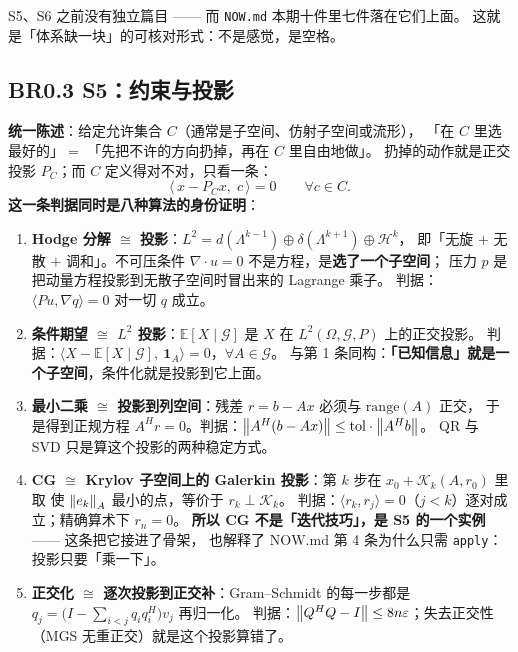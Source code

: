 S5、S6 之前没有独立篇目 —— 而 \texttt{NOW.md} 本期十件里七件落在它们上面。
这就是「体系缺一块」的可核对形式：不是感觉，是空格。

\subsection{BR0.3 S5：约束与投影}

\textbf{统一陈述}：给定允许集合 $C$（通常是子空间、仿射子空间或流形），
「在 $C$ 里选最好的」$=$ 「先把不许的方向扔掉，再在 $C$ 里自由地做」。
扔掉的动作就是正交投影 $P_C$；而 $C$ 定义得对不对，只看一条：
\[
\bigl\langle\, x-P_C x,\; c\,\bigr\rangle=0\qquad \forall c\in C .
\]
\textbf{这一条判据同时是八种算法的身份证明}：

\begin{enumerate}[leftmargin=1.5em]
  \item \textbf{Hodge 分解 $\cong$ 投影}：$L^{2}=d(\Lambda^{k-1})\oplus\delta(\Lambda^{k+1})\oplus\mathcal{H}^{k}$，
        即「无旋 $+$ 无散 $+$ 调和」。不可压条件 $\nabla\cdot u=0$ 不是方程，是\textbf{选了一个子空间}；
        压力 $p$ 是把动量方程投影到无散子空间时冒出来的 Lagrange 乘子。
        判据：$\langle Pu,\nabla q\rangle=0$ 对一切 $q$ 成立。
  \item \textbf{条件期望 $\cong$ $L^{2}$ 投影}：$\mathbb{E}[X\mid\mathcal{G}]$ 是 $X$ 在 $L^{2}(\Omega,\mathcal{G},P)$ 上的正交投影。
        判据：$\langle X-\mathbb{E}[X\mid\mathcal{G}],\ \mathbf{1}_A\rangle=0$，$\forall A\in\mathcal{G}$。
        与第 1 条同构：\textbf{「已知信息」就是一个子空间}，条件化就是投影到它上面。
  \item \textbf{最小二乘 $\cong$ 投影到列空间}：残差 $r=b-Ax$ 必须与 $\mathrm{range}(A)$ 正交，
        于是得到正规方程 $A^{H}r=0$。判据：$\left\lVert A^{H}(b-Ax)\right\rVert\le \mathrm{tol}\cdot\left\lVert A^{H}b\right\rVert$。
        QR 与 SVD 只是算这个投影的两种稳定方式。
  \item \textbf{CG $\cong$ Krylov 子空间上的 Galerkin 投影}：第 $k$ 步在 $x_0+\mathcal{K}_k(A,r_0)$ 里取
        使 $\left\lVert e_k\right\rVert_A$ 最小的点，等价于 $r_k\perp\mathcal{K}_k$。
        判据：$\langle r_k,r_j\rangle=0$（$j<k$）逐对成立；精确算术下 $r_n=0$。
        \textbf{所以 CG 不是「迭代技巧」，是 S5 的一个实例} —— 这条把它接进了骨架，
        也解释了 $\mathrm{NOW.md}$ 第 4 条为什么只需 \texttt{apply}：投影只要「乘一下」。
  \item \textbf{正交化 $\cong$ 逐次投影到正交补}：Gram--Schmidt 的每一步都是
        $q_j=\bigl(I-\sum_{i<j}q_iq_i^{H}\bigr)v_j$ 再归一化。
        判据：$\left\lVert Q^{H}Q-I\right\rVert\le 8n\varepsilon$；失去正交性（MGS 无重正交）就是这个投影算错了。

\end{enumerate}
